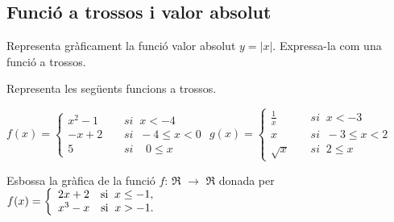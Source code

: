 \subsection{Funció a trossos i valor absolut}
\begin{mylist}
	\exer  Representa gràficament la funció valor absolut $y=|x|$. Expressa-la com una funció a trossos.
	
	
	\exer  Representa les següents funcions a trossos. 
	
	\begin{tasks}
	\task  $f(x)=\left\{\begin{array}{cl} x^{2} -1\; \; \; \;& si\; \; x<-4 \\ -x+2\; \; \; \;& si\; \; -4\le x<0 \\ 5\; \; \; \;& si\; \; \; \; 0\le x \end{array}\right. $  
	\task  $g(x)=\left\{\begin{array}{cl} \frac{1}{x} \; \;& si\; \; x<-3 \\ x\; \; \; & si\; \; -3\le x<2 \\ \sqrt{x} \; \; \; \;& si\; \; 2\le x \end{array}\right. $  
	\end{tasks}


\exer Esbossa la gràfica de la funció $f$: $\Re$ $\rightarrow$ $\Re$ donada per $f(x)=\left\{\begin{array}{l} {2x+2\quad {\rm si\; \; }x\le -1,} \\ {x^{3} -x\quad {\rm si\; \; }x>-1.} \end{array}\right. $


\end{mylist}

